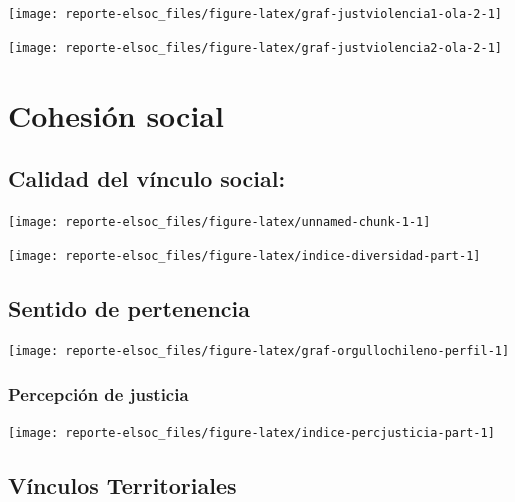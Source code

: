 \documentclass[
  12pt,
]{book}
\begin{document}
\begin{center}\texttt{[image: reporte-elsoc\_files/figure-latex/graf-justviolencia1-ola-2-1]} \end{center}

\begin{center}\texttt{[image: reporte-elsoc\_files/figure-latex/graf-justviolencia2-ola-2-1]} \end{center}

\hypertarget{cohesiuxf3n-social}{%
\chapter{Cohesión social}\label{cohesiuxf3n-social}}

\hypertarget{calidad-del-vuxednculo-social}{%
\section{Calidad del vínculo social:}\label{calidad-del-vuxednculo-social}}

\begin{center}\texttt{[image: reporte-elsoc\_files/figure-latex/unnamed-chunk-1-1]} \end{center}

\begin{center}\texttt{[image: reporte-elsoc\_files/figure-latex/indice-diversidad-part-1]} \end{center}

\hypertarget{sentido-de-pertenencia}{%
\section{Sentido de pertenencia}\label{sentido-de-pertenencia}}

\begin{center}\texttt{[image: reporte-elsoc\_files/figure-latex/graf-orgullochileno-perfil-1]} \end{center}

\hypertarget{percepciuxf3n-de-justicia}{%
\subsection{Percepción de justicia}\label{percepciuxf3n-de-justicia}}

\begin{center}\texttt{[image: reporte-elsoc\_files/figure-latex/indice-percjusticia-part-1]} \end{center}

\hypertarget{vuxednculos-territoriales}{%
\section{Vínculos Territoriales}\label{vuxednculos-territoriales}}
\end{document}
